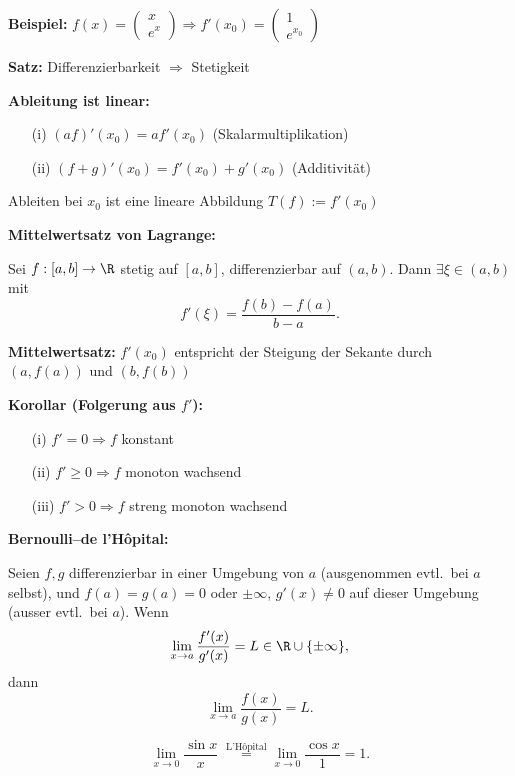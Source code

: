 \begin{itemize}
\textbf{Beispiel:} \(f(x) = \begin{pmatrix} x \\ e^x \end{pmatrix} \Rightarrow f'(x_0) = \begin{pmatrix} 1 \\ e^{x_0} \end{pmatrix}\)

\textbf{Satz:}  
Differenzierbarkeit \(\Rightarrow\) Stetigkeit

\textbf{Ableitung ist linear:}
\begin{itemize}
  \item[(i)] \( (a f)'(x_0) = a f'(x_0) \) \quad (Skalarmultiplikation)
  \item[(ii)] \( (f + g)'(x_0) = f'(x_0) + g'(x_0) \) \quad (Additivität)
\end{itemize}
Ableiten bei \(x_0\) ist eine lineare Abbildung \(T(f) := f'(x_0)\)

\textbf{Mittelwertsatz von Lagrange:}
\begin{theorem}
  Sei $f:[a,b]\to\R$ stetig auf $[a,b]$, differenzierbar auf $(a,b)$. Dann $\exists\xi\in(a,b)$ mit
  \[
    f'(\xi) = \frac{f(b)-f(a)}{b-a}.
  \]
\end{theorem}

\textbf{Mittelwertsatz:}  
\(f'(x_0)\) entspricht der Steigung der Sekante durch \((a, f(a))\) und \((b, f(b))\)

\textbf{Korollar (Folgerung aus \(f'\)):}
\begin{itemize}
  \item[(i)] \(f' = 0 \Rightarrow f\) konstant
  \item[(ii)] \(f' \ge 0 \Rightarrow f\) monoton wachsend
  \item[(iii)] \(f' > 0 \Rightarrow f\) streng monoton wachsend
\end{itemize}


\textbf{Bernoulli–de l’Hôpital:}
\begin{theorem}
  Seien $f,g$ differenzierbar in einer Umgebung von $a$ (ausgenommen evtl.\ bei $a$ selbst), und $f(a)=g(a)=0$ oder $\pm\infty$, $g'(x)\ne0$ auf dieser Umgebung (ausser evtl.\ bei $a$). Wenn
  \[
    \lim_{x\to a} \frac{f'(x)}{g'(x)} = L \in \R \cup \{\pm\infty\},
  \]
  dann
  \[
    \lim_{x\to a} \frac{f(x)}{g(x)} = L.
  \]
\end{theorem}
\begin{example}
  \[
    \lim_{x\to0} \frac{\sin x}{x} 
    \;\stackrel{\text{L'Hôpital}}= 
    \lim_{x\to0} \frac{\cos x}{1} = 1.
  \]
\end{example}


\end{itemize}
